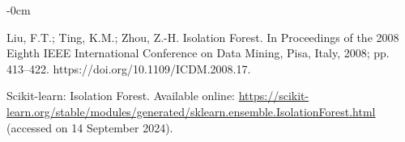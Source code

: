 \documentclass[futureinternet,article,submit,pdftex,moreauthors]{Definitions/mdpi}
\begin{document}
\begin{adjustwidth}{-\extralength}{0cm}
\begin{thebibliography}{999}
Liu, F.T.; Ting, K.M.; Zhou, Z.-H. Isolation Forest. In Proceedings of the 2008 Eighth IEEE International Conference on Data Mining, Pisa, Italy, 2008; pp. 413--422. https://doi.org/10.1109/ICDM.2008.17.

Scikit-learn: Isolation Forest. Available online: \url{https://scikit-learn.org/stable/modules/generated/sklearn.ensemble.IsolationForest.html} (accessed on 14 September 2024).

\end{thebibliography}

%



\PublishersNote{}
\end{adjustwidth}
\end{document}
